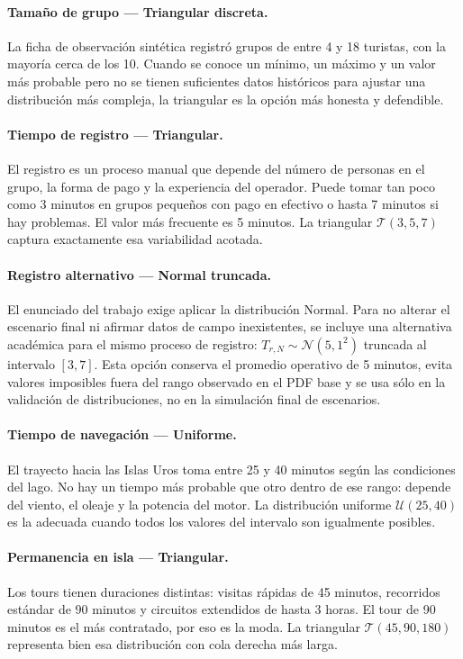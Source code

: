 \documentclass[12pt,a4paper]{article}
\begin{document}
\paragraph{Tamaño de grupo — Triangular discreta.}
La ficha de observación sintética registró grupos de entre 4 y 18
turistas, con la mayoría cerca de los 10. Cuando se conoce un mínimo,
un máximo y un valor más probable pero no se tienen suficientes datos
históricos para ajustar una distribución más compleja, la triangular
es la opción más honesta y defendible.

\paragraph{Tiempo de registro — Triangular.}
El registro es un proceso manual que depende del número de personas en
el grupo, la forma de pago y la experiencia del operador. Puede tomar
tan poco como 3 minutos en grupos pequeños con pago en efectivo o
hasta 7 minutos si hay problemas. El valor más frecuente es 5 minutos.
La triangular $\mathcal{T}(3, 5, 7)$ captura exactamente esa
variabilidad acotada.

\paragraph{Registro alternativo — Normal truncada.}
El enunciado del trabajo exige aplicar la distribución Normal. Para no
alterar el escenario final ni afirmar datos de campo inexistentes, se
incluye una alternativa académica para el mismo proceso de registro:
$T_{r,N} \sim \mathcal{N}(5,1^2)$ truncada al intervalo $[3,7]$. Esta
opción conserva el promedio operativo de 5 minutos, evita valores
imposibles fuera del rango observado en el PDF base y se usa sólo en la
validación de distribuciones, no en la simulación final de escenarios.

\paragraph{Tiempo de navegación — Uniforme.}
El trayecto hacia las Islas Uros toma entre 25 y 40 minutos según las
condiciones del lago. No hay un tiempo más probable que otro dentro de
ese rango: depende del viento, el oleaje y la potencia del motor. La
distribución uniforme $\mathcal{U}(25, 40)$ es la adecuada cuando
todos los valores del intervalo son igualmente posibles.

\paragraph{Permanencia en isla — Triangular.}
Los tours tienen duraciones distintas: visitas rápidas de 45 minutos,
recorridos estándar de 90 minutos y circuitos extendidos de hasta 3
horas. El tour de 90 minutos es el más contratado, por eso es la moda.
La triangular $\mathcal{T}(45, 90, 180)$ representa bien esa
distribución con cola derecha más larga.
\end{document}
